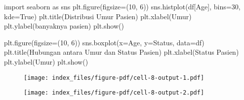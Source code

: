 \documentclass[
  letterpaper,
]{krantz}
\makeatletter
\newenvironment{Shaded}{\begin{snugshade}}{\end{snugshade}}
\newcommand{\DecValTok}[1]{\textcolor[rgb]{0.68,0.00,0.00}{#1}}
\newcommand{\ImportTok}[1]{\textcolor[rgb]{0.00,0.46,0.62}{#1}}
\newcommand{\NormalTok}[1]{\textcolor[rgb]{0.00,0.23,0.31}{#1}}
\newcommand{\OperatorTok}[1]{\textcolor[rgb]{0.37,0.37,0.37}{#1}}
\newcommand{\StringTok}[1]{\textcolor[rgb]{0.13,0.47,0.30}{#1}}
\newcommand{\VariableTok}[1]{\textcolor[rgb]{0.07,0.07,0.07}{#1}}
\newenvironment{kframe}{%
\medskip{}
\setlength{\fboxsep}{.8em}
 \def\at@end@of@kframe{}%
 \ifinner\ifhmode%
  \def\at@end@of@kframe{\end{minipage}}%
  \begin{minipage}{\columnwidth}%
 \fi\fi%
 \def\FrameCommand##1{\hskip\@totalleftmargin \hskip-\fboxsep
 \colorbox{shadecolor}{##1}\hskip-\fboxsep
     \hskip-\linewidth \hskip-\@totalleftmargin \hskip\columnwidth}%
 \MakeFramed {\advance\hsize-\width
   \@totalleftmargin\z@ \linewidth\hsize
   \@setminipage}}%
 {\par\unskip\endMakeFramed%
 \at@end@of@kframe}
\renewenvironment{Shaded}{\begin{kframe}}{\end{kframe}}
\makeatother
\begin{document}
\begin{Shaded}
\begin{Highlighting}[]
\ImportTok{import}\NormalTok{ seaborn }\ImportTok{as}\NormalTok{ sns}
\NormalTok{plt.figure(figsize}\OperatorTok{=}\NormalTok{(}\DecValTok{10}\NormalTok{, }\DecValTok{6}\NormalTok{))}
\NormalTok{sns.histplot(df[}\StringTok{\textquotesingle{}Age\textquotesingle{}}\NormalTok{], bins}\OperatorTok{=}\DecValTok{30}\NormalTok{, kde}\OperatorTok{=}\VariableTok{True}\NormalTok{)}
\NormalTok{plt.title(}\StringTok{\textquotesingle{}Distribusi Umur Pasien\textquotesingle{}}\NormalTok{)}
\NormalTok{plt.xlabel(}\StringTok{\textquotesingle{}Umur\textquotesingle{}}\NormalTok{)}
\NormalTok{plt.ylabel(}\StringTok{\textquotesingle{}banyaknya pasien\textquotesingle{}}\NormalTok{)}
\NormalTok{plt.show()}

\NormalTok{plt.figure(figsize}\OperatorTok{=}\NormalTok{(}\DecValTok{10}\NormalTok{, }\DecValTok{6}\NormalTok{))}
\NormalTok{sns.boxplot(x}\OperatorTok{=}\StringTok{\textquotesingle{}Age\textquotesingle{}}\NormalTok{, y}\OperatorTok{=}\StringTok{\textquotesingle{}Status\textquotesingle{}}\NormalTok{, data}\OperatorTok{=}\NormalTok{df)}
\NormalTok{plt.title(}\StringTok{\textquotesingle{}Hubungan antara Umur dan Status Pasien\textquotesingle{}}\NormalTok{)}
\NormalTok{plt.xlabel(}\StringTok{\textquotesingle{}Status Pasien\textquotesingle{}}\NormalTok{)}
\NormalTok{plt.ylabel(}\StringTok{\textquotesingle{}Umur\textquotesingle{}}\NormalTok{)}
\NormalTok{plt.show()}
\end{Highlighting}
\end{Shaded}

\begin{figure}[H]

{\centering \texttt{[image: index\_files/figure-pdf/cell-8-output-1.pdf]}

}

\end{figure}

\begin{figure}[H]

{\centering \texttt{[image: index\_files/figure-pdf/cell-8-output-2.pdf]}

}

\end{figure}
\end{document}
